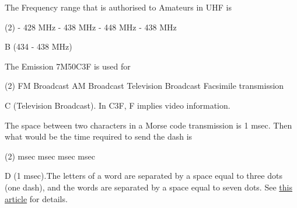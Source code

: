 \documentclass[a4paper]{article}
\begin{document}
\vspace{5mm}



\begin{question}The Frequency range that is authorised to Amateurs in UHF is
	\begin{tasks}(2)
		 - 428 MHz
		 - 438 MHz
		 - 448 MHz
		 - 438 MHz
	\end{tasks}
\end{question}

\begin{solution}
	B (434 - 438 MHz)
\end{solution}

\vspace{5mm}



\begin{question}The Emission \apostrophe{}7M50C3F\apostrophe{} is used for
	\begin{tasks}(2)
		\task FM Broadcast
		\task AM Broadcast
		\task Television Broadcast
		\task Facsimile transmission
	\end{tasks}
\end{question}

\begin{solution}
	C (Television Broadcast). In C3F, \apostrophe{}F\apostrophe{} implies video information.
\end{solution}

\vspace{5mm}



\begin{question}The space between two characters in a Morse code transmission is 1 msec. Then what would be the time required to send the dash is \spaces
	\begin{tasks}(2)
		 msec
		 msec
		 msec
		 msec
	\end{tasks}
\end{question}

\begin{solution}
	D (1 msec).The letters of a word are separated by a space equal to three dots (one dash), and the words are separated by a space equal to seven dots. See \href{https://en.wikipedia.org/wiki/Morse_code}{this article} for details.
\end{solution}

\vspace{5mm}
\end{document}

